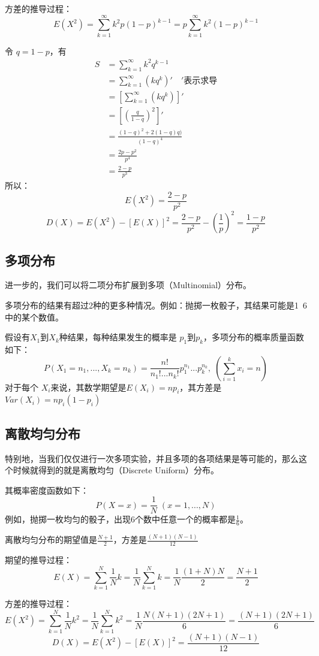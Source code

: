 \documentclass[12pt]{article}
\begin{document}
方差的推导过程：
$$
E(X^2) = \sum_{k=1}^{\infty}k^2p(1-p)^{k-1} = p\sum_{k=1}^{\infty}k^2(1-p)^{k-1}
$$

令 $q = 1 - p$，有
\begin{align}
    S &= \sum_{k=1}^{\infty}k^2q^{k-1} \\
      &= \sum_{k=1}^{\infty}(kq^k)' \quad' \text{表示求导} \\
      &= [\sum_{k=1}^{\infty}(kq^k)]' \\
      &= [(\frac{q}{1-q})^2]' \\
      &= \frac{(1-q)^2+2(1-q)q)}{(1-q)^4} \\
      &= \frac{2p-p^2}{p^4} \\
      &= \frac{2-p}{p^3}
\end{align}
所以：
$$
E(X^2) = \frac{2-p}{p^2}
$$
$$
D(X) = E(X^2) - [E(X)]^2 = \frac{2-p}{p^2} - (\frac{1}{p})^2 = \frac{1-p}{p^2}
$$

\subsection{多项分布}
进一步的，我们可以将二项分布扩展到多项（Multinomial）分布。

多项分布的结果有超过2种的更多种情况。例如：抛掷一枚骰子，其结果可能是1~6中的某个数值。

假设有$X_1$到$X_k$种结果，每种结果发生的概率是
$p_1$到$p_k$，多项分布的概率质量函数如下：
$$
P(X_1=n_1,...,X_k=n_k) = \frac{n!}{n_1! ... n_k !} p_1^{n_1} ... p_k^{n_{k}} , \; (\sum_{i=1}^k x_{i} = n)
$$
对于每个 $X_i$来说，其数学期望是$E(X_i) = np_i$，其方差是$Var(X_i) = np_i(1-p_i)$

\subsection{离散均匀分布}
特别地，当我们仅仅进行一次多项实验，并且多项的各项结果是等可能的，那么这个时候就得到的就是离散均匀（Discrete Uniform）分布。

其概率密度函数如下：
$$
P(X = x) = \frac{1}{N} \; (x= 1,...,N)
$$
例如，抛掷一枚均匀的骰子，出现6个数中任意一个的概率都是$\frac{1}{6}$。

离散均匀分布的期望值是$\frac{N+1}{2}$，方差是$\frac{(N+1)(N-1)}{12}$

期望的推导过程：
$$
E(X) = \sum_{k=1}^{N}\frac{1}{N}k = \frac{1}{N} \sum_{k=1}^{N}k = \frac{1}{N}\frac{(1+N)N}{2} = \frac{N+1}{2}
$$

方差的推导过程：
$$
E(X^2) = \sum_{k=1}^{N}\frac{1}{N}k^2 = \frac{1}{N} \sum_{k=1}^{N}k^2 = \frac{1}{N}\frac{N(N+1)(2N+1)}{6} = \frac{(N+1)(2N+1)}{6}
$$
$$
D(X) = E(X^2) - [E(X)]^2 = \frac{(N+1)(N-1)}{12}
$$
\end{document}

